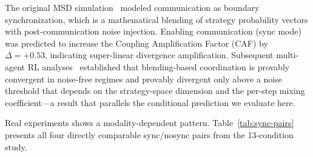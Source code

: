 \documentclass[11pt]{article}
\begin{document}
The original MSD simulation~\cite{mmepc2026} modeled communication as boundary synchronization, which is a mathematical blending of strategy probability vectors with post-communication noise injection. Enabling communication (sync mode) was predicted to increase the Coupling Amplification Factor (CAF) by $\Delta = +0.53$, indicating super-linear divergence amplification. Subsequent multi-agent RL analyses~\cite{kapetanakis2014balanced,foerster2016learning} established that blending-based coordination is provably convergent in noise-free regimes and provably divergent only above a noise threshold that depends on the strategy-space dimension and the per-step mixing coefficient---a result that parallels the conditional prediction we evaluate here.

Real experiments shows a modality-dependent pattern. Table~\ref{tab:sync-pairs} presents all four directly comparable sync/nosync pairs from the 13-condition study.
\end{document}
